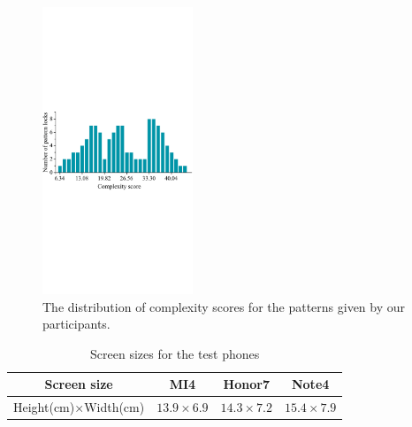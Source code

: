         \begin{figure}[!t]
            \centering
            \includegraphics[width=0.4\textwidth]{fig/pattern-strength.pdf}
            \vspace{-3mm}
            \caption{The distribution of complexity scores for the patterns given by our participants.}
            \vspace{-3mm}
            \label{fig:pattern-strength}
        \end{figure}

    \begin{table}[!t]
            \centering
            \caption{Screen sizes for the test phones}
            \label{tab:locking-screen-size}
            \small
            \begin{tabular}{cccc}
                \toprule
                \textbf{Screen size} & \textbf{MI4} & \textbf{Honor7} & \textbf{Note4} \\
                \midrule
                Height(cm)$\times$Width(cm) & $13.9\times6.9$ & $14.3\times7.2$ & $15.4\times7.9$ \\
                \bottomrule
            \end{tabular}
            \vspace{-5mm}
    \end{table}


